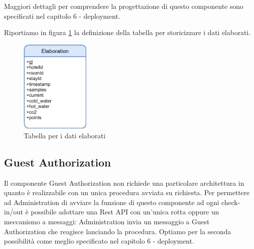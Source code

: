 Maggiori dettagli per comprendere la progettazione di questo componente sono specificati nel capitolo 6 - deployment.

Riportiamo in figura \ref*{er-elaboration} la definizione della tabella per storicizzare i dati elaborati.

\begin{figure}[H]
    \begin{center}
        \includegraphics[width=0.3\textwidth]{images/er-elaboration.png}
    \end{center}
    \caption{\label{er-elaboration} Tabella per i dati elaborati}
\end{figure}

\newpage

\subsection{Guest Authorization}

Il componente Guest Authorization non richiede una particolare architettura in quanto è realizzabile con un unica procedura avviata su richiesta.
Per permettere ad Administration di avviare la funzione di questo componente ad ogni check-in/out è possibile adottare una Rest API con un'unica rotta 
oppure un meccanismo a messaggi: Administration invia un messaggio a Guest Authorization che reagisce lanciando la procedura.
Optiamo per la seconda possibilità come meglio specificato nel capitolo 6 - deployment.
